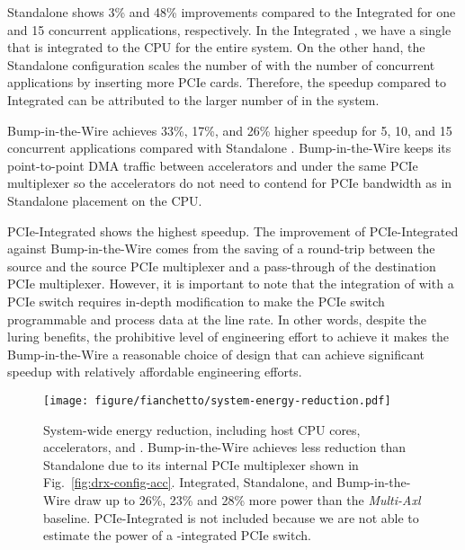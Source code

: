 %
Standalone \drx shows 3\% and 48\% improvements compared to the Integrated for one and 15 concurrent applications, respectively.
%
In the Integrated \drx, we have a single \drx that is integrated to the CPU for the entire system.
%
On the other hand, the Standalone configuration scales the number of \drx with the number of concurrent applications by inserting more \drx PCIe cards.
%
Therefore, the speedup compared to Integrated \drx can be attributed to the larger number of \drx in the system.

%
Bump-in-the-Wire \drx achieves 33\%, 17\%, and 26\% higher speedup for 5, 10, and 15 concurrent applications compared with Standalone \drx.
%
Bump-in-the-Wire \drx keeps its point-to-point DMA traffic between accelerators and \drx under the same PCIe multiplexer so the accelerators do not need to contend for PCIe bandwidth as in Standalone \drx placement on the CPU.
%

%
PCIe-Integrated \drx shows the highest speedup.
%
The improvement of PCIe-Integrated \drx against Bump-in-the-Wire \drx comes from the saving of a round-trip between the source \drx and the source PCIe multiplexer and a pass-through of the destination PCIe multiplexer.
%
However, it is important to note that the integration of \drx with a PCIe switch requires in-depth modification to make the PCIe switch programmable and process data at the line rate. 
%
In other words, despite the luring benefits, the prohibitive level of engineering effort to achieve it makes the Bump-in-the-Wire a reasonable choice of \dmx design that can achieve significant speedup with relatively affordable engineering efforts.

\begin{figure}[t!]
    \centering
    \texttt{[image: figure/fianchetto/system-energy-reduction.pdf]}
    \caption[System-wide energy reduction, including host CPU cores, accelerators, and \drxs.]{System-wide energy reduction, including host CPU cores, accelerators, and \drxs. 
    Bump-in-the-Wire \drx achieves less reduction than Standalone \drx due to its internal PCIe multiplexer shown in Fig.~\ref{fig:drx-config-acc}.
    Integrated, Standalone, and Bump-in-the-Wire \drx draw up to 26\%, 23\% and 28\% more power than the \emph{Multi-Axl} baseline. 
    PCIe-Integrated is not included because we are not able to estimate the power of a \drx-integrated PCIe switch.
    }
    \label{fig:res:energy-drx-placement} 
\end{figure}

